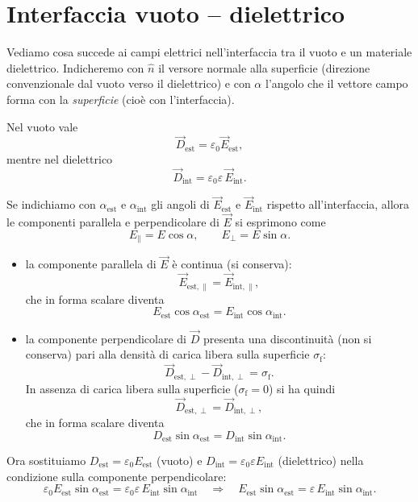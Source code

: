 \documentclass{book}
\begin{document}
 
\section{Interfaccia vuoto -- dielettrico}

Vediamo cosa succede ai campi elettrici nell'interfaccia tra il vuoto e un materiale dielettrico.  
Indicheremo con \(\hat{n}\) il versore normale alla superficie (direzione convenzionale dal vuoto verso il dielettrico) e con \(\alpha\) l'angolo che il vettore campo forma con la \emph{superficie} (cioè con l'interfaccia).

Nel vuoto vale
\[
\vec{D}_{\mathrm{est}}=\varepsilon_0\vec{E}_{\mathrm{est}},
\]
mentre nel dielettrico 
\[
\vec{D}_{\mathrm{int}}=\varepsilon_0\varepsilon\,\vec{E}_{\mathrm{int}}.
\]

Se indichiamo con \(\alpha_{\text{est}}\) e \(\alpha_{\text{int}}\) gli angoli di \(\vec{E}_{\text{est}}\) e \(\vec{E}_{\text{int}}\) rispetto all'interfaccia, allora le componenti parallela e perpendicolare di \(\vec{E}\) si esprimono come
\[
E_{\parallel}=E\cos\alpha,\qquad E_{\perp}=E\sin\alpha.
\]

\begin{itemize}
  \item la componente parallela di \(\vec{E}\) è continua (si conserva):
  \[
  \vec{E}_{\mathrm{est},\parallel}=\vec{E}_{\mathrm{int},\parallel},
  \]
  che in forma scalare diventa
  \[
  E_{\mathrm{est}}\cos\alpha_{\mathrm{est}} = E_{\mathrm{int}}\cos\alpha_{\mathrm{int}}.
  \]

  \item la componente perpendicolare di \(\vec{D}\) presenta una discontinuità (non si conserva) pari alla densità di carica libera sulla superficie \(\sigma_{\mathrm{f}}\):
  \[
  \vec{D}_{\mathrm{est},\perp}-\vec{D}_{\mathrm{int},\perp}=\sigma_{\mathrm{f}}.
  \]
  In assenza di carica libera sulla superficie (\(\sigma_{\mathrm{f}}=0\)) si ha quindi
  \[
  \vec{D}_{\mathrm{est},\perp}=\vec{D}_{\mathrm{int},\perp},
  \]
  che in forma scalare diventa
  \[
  D_{\mathrm{est}}\sin\alpha_{\mathrm{est}} = D_{\mathrm{int}}\sin\alpha_{\mathrm{int}}.
  \]
\end{itemize}
\vspace{0.2cm}
Ora sostituiamo \(D_{\mathrm{est}}=\varepsilon_0 E_{\mathrm{est}}\) (vuoto) e \(D_{\mathrm{int}}=\varepsilon_0\varepsilon E_{\mathrm{int}}\) (dielettrico) nella condizione sulla componente perpendicolare:
\[
\varepsilon_0 E_{\mathrm{est}}\sin\alpha_{\mathrm{est}}
= \varepsilon_0\varepsilon\,E_{\mathrm{int}}\sin\alpha_{\mathrm{int}}
\quad\Longrightarrow\quad
E_{\mathrm{est}}\sin\alpha_{\mathrm{est}} = \varepsilon\,E_{\mathrm{int}}\sin\alpha_{\mathrm{int}}.
\]
\end{document}
